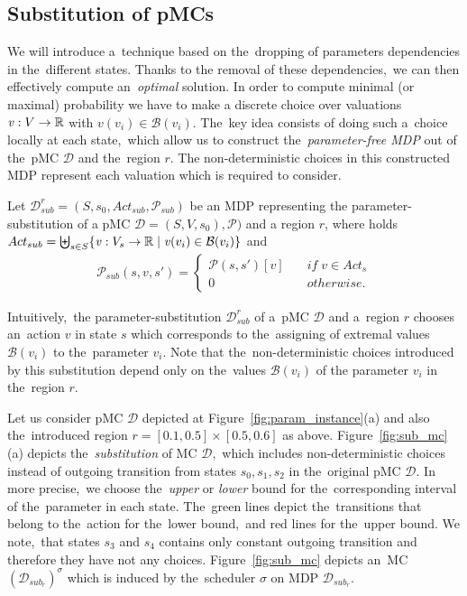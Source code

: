 \subsection{Substitution of pMCs}
We will introduce a~technique based on the~dropping of parameters dependencies in the~different states.
Thanks to the removal of these dependencies,~we can then effectively compute an~\textit{optimal} solution.
In order to compute minimal (or maximal) probability we have to make a discrete choice over valuations $\mathit{v}: V \rightarrow \mathbb{R}$ with $\mathit{v}(v_i) \in \mathcal{B}(v_i)$.
The~key idea consists of doing such a~choice locally at each state,~which allow us to construct the~\textit{parameter-free MDP} out of the~pMC $\mathcal{D}$ and the~region $r$.
The non-deterministic choices in this constructed MDP represent each valuation which is required to consider.

\begin{definition} \label{def:sub_mc}
Let $\mathcal{D}_{sub}^{r} = (S, s_0, Act_{sub}, \mathcal{P}_{sub})$ be an MDP representing the parameter-substitution of a pMC $\mathcal{D} = (S, V, s_0), \mathcal{P})$ and a region $r$, where holds $Act_{sub} = \biguplus_{s \in S}\{ \mathit{v}: V_s \rightarrow \mathbb{R} \; \lvert \; \mathit{v}(v_i) \in \mathcal{B}(v_i) \}$ and
\begin{align*}
    \mathcal{P}_{sub}(s, \mathit{v}, s') = 
    \begin{cases}
        \mathcal{P}(s, s')[\mathit{v}] \quad & if \; v \in Act_s \\
        0 \quad & otherwise.
    \end{cases}
\end{align*}
\end{definition}
\noindent
Intuitively,~the parameter-substitution $\mathcal{D}_{sub}^r$ of a~pMC $\mathcal{D}$ and a~region $r$ chooses an~action $\mathit{v}$ in state $s$ which corresponds to the~assigning of extremal values $\mathcal{B}(v_i)$ to the~parameter $v_i$. 
Note that the~non-deterministic choices introduced by this substitution depend only on the~values $\mathcal{B}(v_i)$ of the parameter $v_i$ in the~region $r$.

\begin{example}
Let us consider pMC $\mathcal{D}$ depicted at Figure~\ref{fig:param_instance}(a) and also the~introduced region $r = [0.1, 0.5] \times [0.5, 0.6]$ as above.
Figure~\ref{fig:sub_mc}(a) depicts the~\textit{substitution} of MC $\mathcal{D}$,~which includes non-deterministic choices instead of outgoing transition from states $s_0, s_1, s_2$ in the~original pMC $\mathcal{D}$.
In more precise,~we choose the~\textit{upper} or \textit{lower} bound for the~corresponding interval of the~parameter in each state.
The~green lines depict the~transitions that belong to the~action for the~lower bound,~and red lines for the~upper bound.
We note,~that states $s_3$ and $s_4$ contains only constant outgoing transition and therefore they have not any choices.
Figure~\ref{fig:sub_mc} depicts an~MC $(\mathcal{D}_{sub_r})^\sigma$ which is induced by the~scheduler $\sigma$ on MDP $\mathcal{D}_{sub_r}$.
\end{example}

